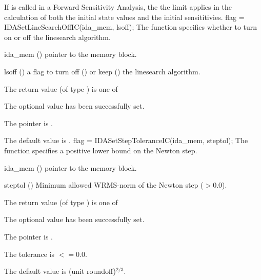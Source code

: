 {{  If  is called in a Forward Sensitivity Analysis, the 
  the limit  applies in the calculation of both the initial state
  values and the initial sensititivies.
}
{
flag = IDASetLineSearchOffIC(ida\_mem, lsoff);
}
{
  The function  specifies whether to turn
  on or off the linesearch algorithm.
}
{
  \begin{args}
  \item[ida\_mem] ()
    pointer to the {\idas} memory block.
  \item[lsoff] ()
    a flag to turn off () or keep () the linesearch
    algorithm.
  \end{args}
}
{
  The return value  (of type ) is one of
  \begin{args}
  \item[\Id{IDA\_SUCCESS}] 
    The optional value has been successfully set.
  \item[\Id{IDA\_MEM\_NULL}]
    The  pointer is .
  \end{args}
}
{
  The default value is .
}
{
flag = IDASetStepToleranceIC(ida\_mem, steptol);
}
{
  The function  specifies a positive lower bound
  on the Newton step.
}
{
  \begin{args}
  \item[ida\_mem] ()
    pointer to the {\idas} memory block.
  \item[steptol] ()
    Minimum allowed WRMS-norm of the Newton step ($> 0.0$).
  \end{args}
}
{
  The return value  (of type ) is one of
  \begin{args}
  \item[\Id{IDA\_SUCCESS}] 
    The optional value has been successfully set.
  \item[\Id{IDA\_MEM\_NULL}]
    The  pointer is .
  \item[\Id{IDA\_ILL\_INPUT}]
    The  tolerance is  $<= 0.0$.
  \end{args}
}
{
  The default value is (unit roundoff)$^{2/3}$.
}



}

